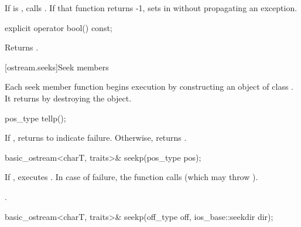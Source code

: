 \begin{itemdescr}
\pnum
If
is
,
calls
. If that function returns -1, sets  in
 without propagating an exception.
\end{itemdescr}

%
\begin{itemdecl}
explicit operator bool() const;
\end{itemdecl}

\begin{itemdescr}
\pnum
\effects
Returns
.
\end{itemdescr}

[ostream.seeks]{Seek members}

\pnum
Each seek member function begins execution by constructing an object of class .
It returns by destroying the  object.

%
\begin{itemdecl}
pos_type tellp();
\end{itemdecl}

\begin{itemdescr}
\pnum
\returns
If
,
returns
to indicate failure.
Otherwise, returns
.
\end{itemdescr}

%
\begin{itemdecl}
basic_ostream<charT, traits>& seekp(pos_type pos);
\end{itemdecl}

\begin{itemdescr}
\pnum
\effects
If
,
executes
.
In case of failure, the function calls
(which may throw
).

\pnum
\returns
{}.
\end{itemdescr}

%
\begin{itemdecl}
basic_ostream<charT, traits>& seekp(off_type off, ios_base::seekdir dir);
\end{itemdecl}

